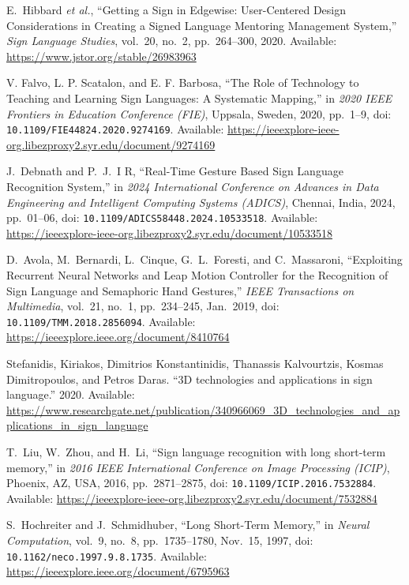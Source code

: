 \documentclass[12pt]{article}
\begin{document}
\begin{thebibliography}{99}

E.~Hibbard \emph{et al.}, 
“Getting a Sign in Edgewise: User-Centered Design Considerations in Creating a Signed Language Mentoring Management System,” 
\emph{Sign Language Studies}, vol.~20, no.~2, pp.~264--300, 2020. 
Available: \url{https://www.jstor.org/stable/26983963}  

V. Falvo, L. P. Scatalon, and E. F. Barbosa, 
“The Role of Technology to Teaching and Learning Sign Languages: A Systematic Mapping,” 
in \emph{2020 IEEE Frontiers in Education Conference (FIE)}, Uppsala, Sweden, 2020, pp.~1--9, 
doi: \texttt{10.1109/FIE44824.2020.9274169}.  
Available: \url{https://ieeexplore-ieee-org.libezproxy2.syr.edu/document/9274169}

J.~Debnath and P.~J.~I R, 
“Real-Time Gesture Based Sign Language Recognition System,” 
in \emph{2024 International Conference on Advances in Data Engineering and Intelligent Computing Systems (ADICS)}, 
Chennai, India, 2024, pp.~01--06, 
doi: \texttt{10.1109/ADICS58448.2024.10533518}.
Available: \url{https://ieeexplore-ieee-org.libezproxy2.syr.edu/document/10533518}

D.~Avola, M.~Bernardi, L.~Cinque, G.~L.~Foresti, and C.~Massaroni, 
“Exploiting Recurrent Neural Networks and Leap Motion Controller for the Recognition of Sign Language and Semaphoric Hand Gestures,” 
\emph{IEEE Transactions on Multimedia}, vol.~21, no.~1, pp.~234--245, Jan.~2019, 
doi: \texttt{10.1109/TMM.2018.2856094}. 
Available: \url{https://ieeexplore.ieee.org/document/8410764}

Stefanidis, Kiriakos, Dimitrios Konstantinidis, Thanassis Kalvourtzis,  
Kosmas Dimitropoulos, and Petros Daras.  
“3D technologies and applications in sign language.” 2020. 
Available: \url{https://www.researchgate.net/publication/340966069_3D_technologies_and_applications_in_sign_language}

T.~Liu, W.~Zhou, and H.~Li, 
“Sign language recognition with long short-term memory,” 
in \emph{2016 IEEE International Conference on Image Processing (ICIP)}, 
Phoenix, AZ, USA, 2016, pp.~2871--2875, 
doi: \texttt{10.1109/ICIP.2016.7532884}.  
Available: \url{https://ieeexplore-ieee-org.libezproxy2.syr.edu/document/7532884}

S.~Hochreiter and J.~Schmidhuber, 
“Long Short-Term Memory,” 
in \emph{Neural Computation}, vol.~9, no.~8, pp.~1735--1780, Nov.~15, 1997, 
doi: \texttt{10.1162/neco.1997.9.8.1735}. 
Available: \url{https://ieeexplore.ieee.org/document/6795963}


\end{thebibliography}
\end{document}
